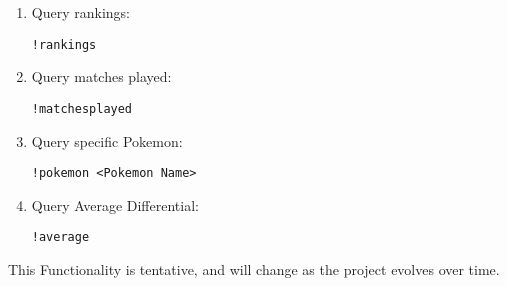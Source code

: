 \documentclass{article}
\begin{document}
\begin{itemize}
\begin{enumerate}
\begin{algorithm}[H]
        \end{algorithm}
        \item Query rankings:
        \begin{algorithm}[H]
            \verb|!rankings|
            \label{pseudoPSO}
            \begin{algorithmic}
                \EndFunction
            \end{algorithmic}
        \end{algorithm}
        \item Query matches played:
        \begin{algorithm}[H]
            \verb|!matchesplayed|
            \label{pseudoPSO}
            \begin{algorithmic}
                \EndFunction
            \end{algorithmic}
        \end{algorithm}
        \item Query specific Pokemon:
        \begin{algorithm}[H]
            \verb|!pokemon <Pokemon Name>|
            \label{pseudoPSO}
            \begin{algorithmic}
                \EndIf
                \EndFunction
            \end{algorithmic}
        \end{algorithm}
        \item Query Average Differential:
        \begin{algorithm}[H]
            \verb|!average |
            \label{pseudoPSO}
            \begin{algorithmic}
                \EndFunction
            \end{algorithmic}
        \end{algorithm}
    \end{enumerate}
\end{itemize}
    This Functionality is tentative, and will change as the project evolves over time.
\end{document}
